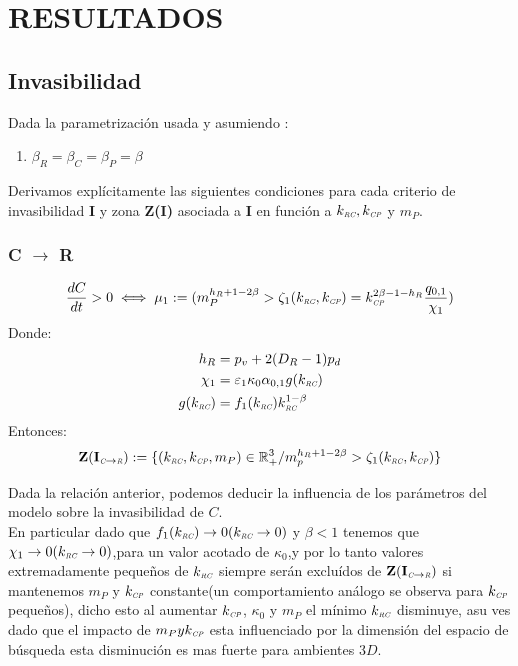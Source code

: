 \section{RESULTADOS}


\subsection{Invasibilidad}
Dada la parametrizaci\'on usada y asumiendo :
\begin{enumerate}
\item $\beta_R = \beta_C = \beta_P = \beta$
\end{enumerate}

Derivamos expl\'icitamente las siguientes condiciones para cada criterio de invasibilidad \textbf{I} y zona \textbf{Z(I)} asociada a \textbf{I} en funci\'on a $k_{\textit{\tiny RC}},k_{\textit{\tiny CP}}$ y $m_P$.

\subsubsection{C $\to$ R}

\begin{equation}
  \frac{dC}{dt} >0 \iff  \mu_1 := (m_P^{h_R +1 - 2\beta} > \zeta_1(k_{\textit{\tiny RC}},k_{\textit{\tiny CP}}) = k_{\textit{\tiny CP}}^{2\beta -1 -h_R}\frac{q_{0,1}}{\chi_1})
\end{equation}
Donde:
\begin{equation}
  \begin{aligned}
    h_R &= p_v + 2(D_R - 1)p_d \\
    \chi_1 &= \varepsilon_1 \kappa_0\alpha_{0,1} g(k_{\textit{\tiny RC}}) \\
    g(k_{\textit{\tiny RC}}) &= f_1(k_{\textit{\tiny RC}})k_{\textit{\tiny RC}}^{1-\beta}\\
  \end{aligned}
\end{equation}
Entonces:
\begin{equation}
\mathbf{Z(I_{\textit{\tiny C}\to \textit{\tiny R}})} := \{ (k_{\textit{\tiny RC}},k_{\textit{\tiny CP}},m_P) \in \mathbb{R}^3_+ / m_p^{h_R + 1 - 2\beta} > \zeta_1(k_{\textit{\tiny RC}},k_{\textit{\tiny CP}}) \}
\end{equation}


Dada la relaci\'on anterior, podemos deducir la influencia de los par\'ametros del modelo sobre la invasibilidad de $C$.\\

En particular dado que $f_1(k_{\textit{\tiny RC}}) \to 0 (k_{\textit{\tiny RC}} \to 0)$ y $\beta <1$ tenemos que $\chi_1 \to 0 (k_{\textit{\tiny RC}} \to 0)$,para un valor acotado de $\kappa_0$,y por lo tanto valores extremadamente peque\~nos de $k_{\textit{\tiny RC}}$ siempre ser\'an exclu\'idos de $\mathbf{Z(I_{\textit{\tiny C}\to \textit{\tiny R}})}$ si mantenemos $m_P$ y $k_{\textit{\tiny CP}}$ constante(un comportamiento an\'alogo se observa para $k_{\textit{\tiny CP}}$ peque\~nos), dicho esto al aumentar $k_{\textit{\tiny CP}}$, $\kappa_0$ y $m_P$ el m\'inimo $k_{\textit{\tiny RC}}$ disminuye, asu ves dado que el impacto de $m_P y k_{\textit{\tiny CP}}$ esta influenciado por la dimensi\'on del espacio de b\'usqueda esta disminuci\'on es mas fuerte para ambientes $3D$.\\

